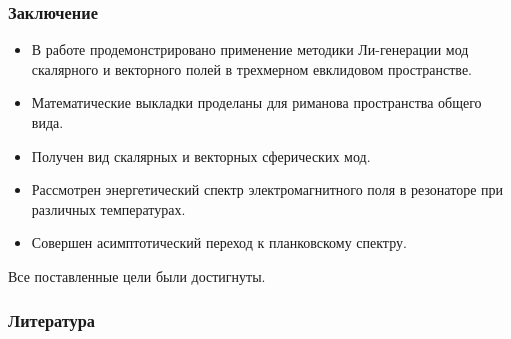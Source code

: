 \documentclass[compress]{beamer}
\begin{document}

    \begin{frame}\frametitle{Заключение}

        \begin{itemize}\justifying
            \item В работе продемонстрировано применение методики Ли-генерации мод скалярного и векторного полей в трехмерном евклидовом пространстве.

            \item Математические выкладки проделаны для риманова пространства общего вида.

            \item Получен вид скалярных и векторных сферических мод.

            \item Рассмотрен энергетический спектр электромагнитного поля в резонаторе при различных температурах.

            \item Совершен асимптотический переход к планковскому спектру.
        \end{itemize}

        Все поставленные цели были достигнуты.

    \end{frame}


    \begin{frame}\frametitle{Литература}
        \nocite{burlankov_tmf,methods_of_theoretical_physics}
        
        
    \end{frame}
\end{document}
